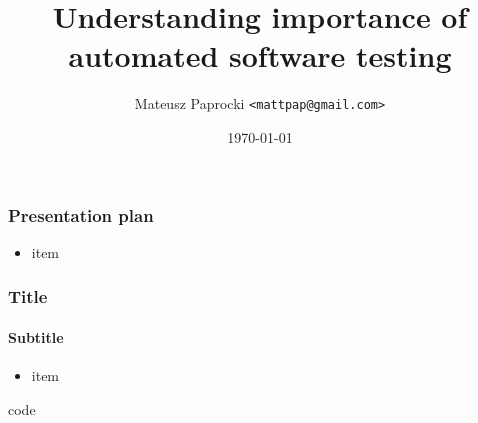 \documentclass{beamer}
\title{Understanding importance of automated software testing}
\author{Mateusz Paprocki \texttt{<mattpap@gmail.com>}}
\institute{SymPy Development Team}
\date{\today}
\begin{document}

\frame{\titlepage}

\begin{frame}[fragile]
    \frametitle{Presentation plan}

    \begin{itemize}
        \item item
    \end{itemize}
\end{frame}

\begin{frame}[fragile]
    \frametitle{Title}
    \framesubtitle{Subtitle}

    \begin{itemize}
        \item item
    \end{itemize}
    \pause
    \begin{python}
    code
    \end{python}
\end{frame}

\end{document}

